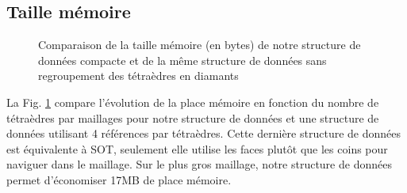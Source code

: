 \subsection{Taille mémoire}
\begin{figure}[H]
\centering
\pgfplotsset{width=15cm,height=7cm}
\caption{Comparaison de la taille mémoire (en bytes) de notre structure de données compacte et de la même structure de données sans regroupement des tétraèdres en diamants}
\label{fig:taille_memoire}
\end{figure}
\noindent
La Fig. \ref{fig:taille_memoire} compare l'évolution de la place mémoire en fonction du nombre de tétraèdres par maillages pour notre structure de données et une structure de données utilisant 4 références par tétraèdres. Cette dernière structure de données est équivalente à SOT, seulement elle utilise les faces plutôt que les coins pour naviguer dans le maillage. Sur le plus gros maillage, notre structure de données permet d'économiser 17MB de place mémoire.

%

